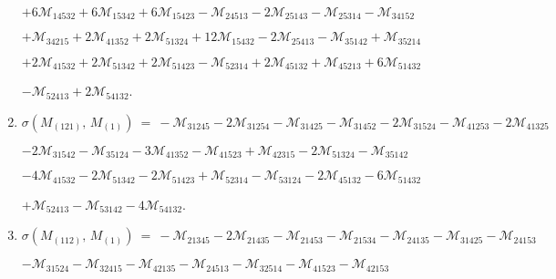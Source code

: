 \documentclass[12pt]{article}
\newcommand{\M}{\mathcal{M}}
\begin{document}
\begin{enumerate}
      \hspace{10pt}
      $+6\M_{14532} 
       +6\M_{15342} +6\M_{15423} 
       -\M_{24513} -2\M_{25143} 
       -\M_{25314} -\M_{34152} $\vspace{-6pt}

      \hspace{10pt}
      $+\M_{34215} +2\M_{41352} 
       +2\M_{51324} +12\M_{15432} 
       -2\M_{25413} -\M_{35142} 
       +\M_{35214} $\vspace{-6pt}

      \hspace{10pt}
      $+2\M_{41532} 
       +2\M_{51342} +2\M_{51423} 
       -\M_{52314} +2\M_{45132} 
       +\M_{45213} +6\M_{51432} $\vspace{-6pt}

      \hspace{10pt}
      $-\M_{52413} +2\M_{54132} $.\vspace{-8pt}
\item[]\hspace{-50pt}$\sigma(M_{(121)},\,M_{(1)})\ =\ 
        -\M_{31245} -2\M_{31254} 
       -\M_{31425} -\M_{31452} 
       -2\M_{31524} -\M_{41253} 
       -2\M_{41325} $\vspace{-6pt}

      \hspace{10pt}
      $-2\M_{31542} 
       -\M_{35124} -3\M_{41352} 
       -\M_{41523} +\M_{42315} 
       -2\M_{51324} -\M_{35142} $\vspace{-6pt}

      \hspace{10pt}
      $-4\M_{41532} -2\M_{51342} 
       -2\M_{51423} +\M_{52314} 
       -\M_{53124} -2\M_{45132} 
       -6\M_{51432} $\vspace{-6pt}

      \hspace{10pt}
      $+\M_{52413} 
       -\M_{53142} -4\M_{54132} $.\vspace{-8pt}
\item[]\hspace{-50pt}$\sigma(M_{(112)},\,M_{(1)})\ =\ 
        -\M_{21345} -2\M_{21435} 
       -\M_{21453} -\M_{21534} 
       -\M_{24135} -\M_{31425} 
       -\M_{24153} $\vspace{-6pt}

      \hspace{10pt}
      $-\M_{31524} 
       -\M_{32415} -\M_{42135} 
       -\M_{24513} -\M_{32514} 
       -\M_{41523} -\M_{42153} $\vspace{-6pt}


\end{enumerate}
\end{document}
